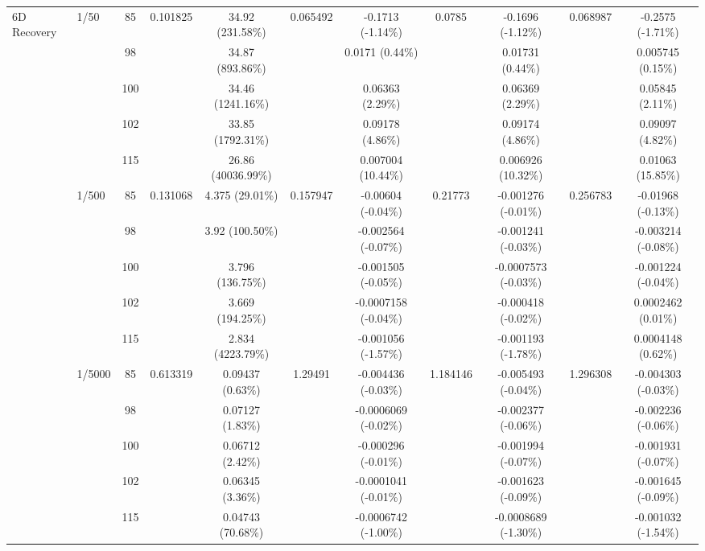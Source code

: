 \begin{table}[htbp]
{\begin{tabular}{llccccccccc}
\multirow{15}{*}{6D Recovery}
& \multirow{5}{*}{1/50} & 85 & \multirow{5}{*}{0.101825} & 34.92 (231.58\%) & \multirow{5}{*}{0.065492} & -0.1713 (-1.14\%) & \multirow{5}{*}{0.0785} & -0.1696 (-1.12\%) & \multirow{5}{*}{0.068987} & -0.2575 (-1.71\%) \\
& & 98 & & 34.87 (893.86\%) & & 0.0171 (0.44\%) & & 0.01731 (0.44\%) & & 0.005745 (0.15\%) \\
& & 100 & & 34.46 (1241.16\%) & & 0.06363 (2.29\%) & & 0.06369 (2.29\%) & & 0.05845 (2.11\%) \\
& & 102 & & 33.85 (1792.31\%) & & 0.09178 (4.86\%) & & 0.09174 (4.86\%) & & 0.09097 (4.82\%) \\
& & 115 & & 26.86 (40036.99\%) & & 0.007004 (10.44\%) & & 0.006926 (10.32\%) & & 0.01063 (15.85\%) \\
\cmidrule(lr){2-11}
& \multirow{5}{*}{1/500} & 85 & \multirow{5}{*}{0.131068} & 4.375 (29.01\%) & \multirow{5}{*}{0.157947} & -0.00604 (-0.04\%) & \multirow{5}{*}{0.21773} & -0.001276 (-0.01\%) & \multirow{5}{*}{0.256783} & -0.01968 (-0.13\%) \\
& & 98 & & 3.92 (100.50\%) & & -0.002564 (-0.07\%) & & -0.001241 (-0.03\%) & & -0.003214 (-0.08\%) \\
& & 100 & & 3.796 (136.75\%) & & -0.001505 (-0.05\%) & & -0.0007573 (-0.03\%) & & -0.001224 (-0.04\%) \\
& & 102 & & 3.669 (194.25\%) & & -0.0007158 (-0.04\%) & & -0.000418 (-0.02\%) & & 0.0002462 (0.01\%) \\
& & 115 & & 2.834 (4223.79\%) & & -0.001056 (-1.57\%) & & -0.001193 (-1.78\%) & & 0.0004148 (0.62\%) \\
\cmidrule(lr){2-11}
& \multirow{5}{*}{1/5000} & 85 & \multirow{5}{*}{0.613319} & 0.09437 (0.63\%) & \multirow{5}{*}{1.29491} & -0.004436 (-0.03\%) & \multirow{5}{*}{1.184146} & -0.005493 (-0.04\%) & \multirow{5}{*}{1.296308} & -0.004303 (-0.03\%) \\
& & 98 & & 0.07127 (1.83\%) & & -0.0006069 (-0.02\%) & & -0.002377 (-0.06\%) & & -0.002236 (-0.06\%) \\
& & 100 & & 0.06712 (2.42\%) & & -0.000296 (-0.01\%) & & -0.001994 (-0.07\%) & & -0.001931 (-0.07\%) \\
& & 102 & & 0.06345 (3.36\%) & & -0.0001041 (-0.01\%) & & -0.001623 (-0.09\%) & & -0.001645 (-0.09\%) \\
& & 115 & & 0.04743 (70.68\%) & & -0.0006742 (-1.00\%) & & -0.0008689 (-1.30\%) & & -0.001032 (-1.54\%) \\
\bottomrule
  \end{tabular}%
  }
\end{table}

